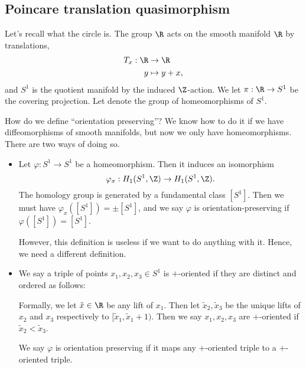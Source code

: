 \documentclass[a4paper]{article}
\newcommand\Homeo{\mathrm{Homeo}}
\begin{document}
\subsection{Poincare translation quasimorphism}
Let's recall what the circle is. The group $\R$ acts on the smooth manifold $\R$ by translations,
\begin{align*}
  T_x: \R &\to \R\\
  y &\mapsto y + x,
\end{align*}
and $S^1$ is the quotient manifold by the induced $\Z$-action. We let $\pi: \R \to S^1$ be the covering projection. Let \term{$\Homeo^+(S^1)$} denote the group of homeomorphisms of $S^1$.

How do we define ``orientation preserving''? We know how to do it if we have diffeomorphisms of smooth manifolds, but now we only have homeomorphisms. There are two ways of doing so.
\begin{itemize}
  \item Let $\varphi: S^1 \to S^1$ be a homeomorphism. Then it induces an isomorphism
    \[
      \varphi_x: H_1(S^1, \Z) \to H_1(S^1, \Z).
    \]
    The homology group is generated by a fundamental class $[S^1]$. Then we must have $\varphi_x([S^1]) = \pm [S^1]$, and we say $\varphi$ is orientation-preserving if $\varphi([S^1]) = [S^1]$.

    However, this definition is useless if we want to do anything with it. Hence, we need a different definition.
  \item We say a triple of points $x_1, x_2, x_3 \in S^1$ is $+$-oriented if they are distinct and ordered as follows:
    \begin{center}
    \end{center}
    Formally, we let $\tilde{x} \in \R$ be any lift of $x_1$. Then let $\tilde{x}_2, \tilde{x}_3$ be the unique lifts of $x_2$ and $x_3$ respectively to $[\tilde{x}_1, \tilde{x}_1 + 1)$. Then we say $x_1, x_2, x_3$ are $+$-oriented if $\tilde{x}_2 < \tilde{x}_3$.

      We say $\varphi$ is orientation preserving if it maps any $+$-oriented triple to a $+$-oriented triple.
\end{itemize}
\end{document}
